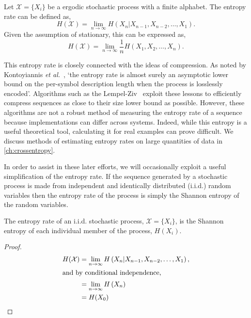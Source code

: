 \begin{definition}\label{def:entropyrate}
	Let  $\mathcal{X}= \{ X_i \}$ be a ergodic stochastic process with a finite alphabet. 
	The entropy rate can be defined as,
	\begin{equation}\label{eq:entropyrate}
	H(\mathcal{X})=\lim _{n \rightarrow \infty} H\left(X_{n} | X_{n-1}, X_{n-2}, \ldots, X_{1}\right).
	\end{equation}
	Given the assumption of stationary, this can be expressed as,
	\begin{equation}
	H(\mathcal{X})=\lim _{n \rightarrow \infty} \frac{1}{n} H\left(X_{1}, X_{2}, \ldots, X_{n}\right).
	\end{equation}
\end{definition}

This entropy rate is closely connected with the ideas of compression. As noted by Kontoyiannis \emph{et al.}~\cite{kontoyiannis_nonparametric_1998}, `the entropy rate is almost surely an asymptotic lower bound on the per-symbol description length when the process is losslessly encoded'. Algorithms such as the Lempel-Ziv~\cite{ziv_compression_1978} exploit these lessons to efficiently compress sequences as close to their size lower bound as possible. However, these algorithms are not a robust method of measuring the entropy rate of a sequence because implementations can differ across systems. Indeed, while this entropy is a useful theoretical tool, calculating it for real examples can prove difficult. We discuss methods of estimating entropy rates on large quantities of data in \autoref{ch:crossentropy}.

In order to assist in these later efforts, we will occasionally exploit a useful simplification of the entropy rate. If the sequence generated by a stochastic process is made from independent and identically distributed  (i.i.d.) random variables then the entropy rate of the process is simply the Shannon entropy of the random variables. 

\begin{lemma}
	The entropy rate of an i.i.d. stochastic process, $\mathcal{X}= \{ X_i \}$, is the Shannon entropy of each individual member of the process, $H(X_i)$.
\end{lemma}

\begin{proof}\label{proof:iidentroptrate}
\begin{align}
H(\mathcal{X})&=\lim _{n \rightarrow \infty} H\left(X_{n} | X_{n-1}, X_{n-2}, \ldots, X_{1}\right), \\
\intertext{and by conditional independence,}
&=\lim _{n \rightarrow \infty} H\left(X_{n} \right) \nonumber \\
&= H(X_0)
\end{align}
\end{proof}

